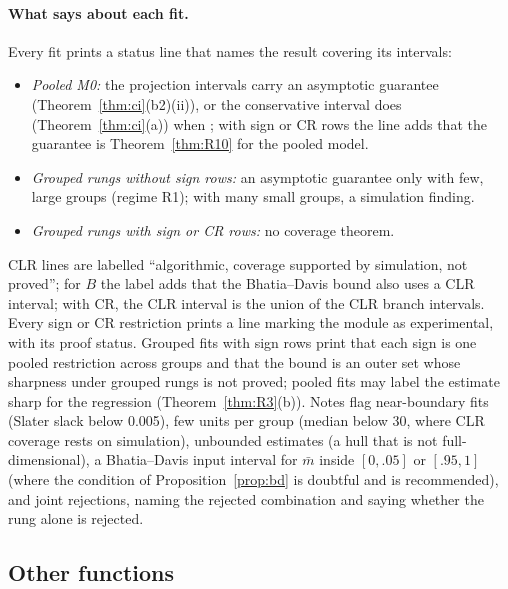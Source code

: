 \paragraph{What  says about each fit.} Every fit prints a status line
that names the result covering its intervals:
\begin{itemize}
\item \emph{Pooled M0:} the projection intervals carry an asymptotic guarantee
(Theorem~\ref{thm:ci}(b2)(ii)), or the conservative interval does
(Theorem~\ref{thm:ci}(a)) when ; with sign or CR rows the
line adds that the guarantee is Theorem~\ref{thm:R10} for the pooled model.
\item \emph{Grouped rungs without sign rows:} an asymptotic guarantee only with few,
large groups (regime R1); with many small groups, a simulation finding.
\item \emph{Grouped rungs with sign or CR rows:} no coverage theorem.
\end{itemize}
CLR lines are labelled ``algorithmic, coverage supported by simulation, not
proved''; for $B$ the label adds that the Bhatia--Davis bound also uses a CLR
interval; with CR, the CLR interval is the union of the CLR branch intervals.
Every sign or CR restriction prints a line marking the module as experimental,
with its proof status. Grouped fits with sign rows print that each sign is one
pooled restriction across groups and that the bound is an outer set whose
sharpness under grouped rungs is not proved; pooled fits may label the estimate
sharp for the regression (Theorem~\ref{thm:R3}(b)). Notes flag near-boundary fits
(Slater slack below 0.005), few units per group (median below 30, where CLR
coverage rests on simulation), unbounded estimates (a hull that is not
full-dimensional), a Bhatia--Davis input interval for $\bar m$ inside $[0,.05]$
or $[.95,1]$ (where the condition of Proposition~\ref{prop:bd} is doubtful and
 is recommended), and joint rejections, naming the rejected
combination and saying whether the rung alone is rejected.

\subsection{Other functions}

